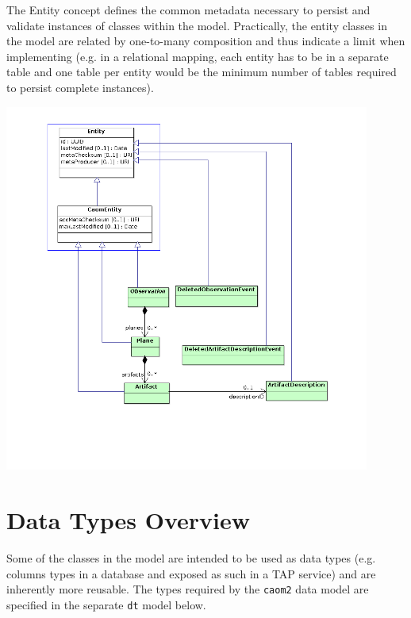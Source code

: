 \documentclass[11pt,a4paper]{ivoa}
\begin{document}
The Entity concept defines the common metadata necessary to persist and validate 
instances of classes within the model. Practically, the entity classes in the 
model are related by one-to-many composition and thus indicate a limit when
implementing (e.g. in a relational mapping, each entity has to be in a separate
table and one table per entity would be the minimum number of tables required 
to persist complete instances).

\begin{center}
\includegraphics[width=0.9\textwidth]{src/uml/CAOM4entities.png}
\label{fig:entity}
\end{center}



\section{Data Types Overview}
Some of the classes in the model are intended to be used as data types (e.g. columns
types in a database and exposed as such in a TAP service) and are inherently more reusable.
The types required by the \verb|caom2| data model are specified in the separate \verb|dt| model
below.
\end{document}
